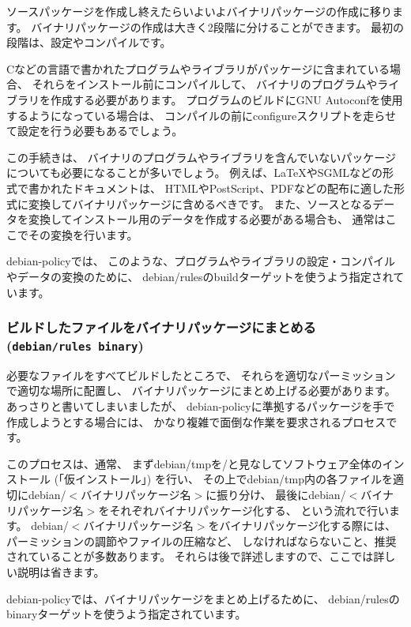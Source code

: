 \documentclass[mingoth,a4paper]{jsarticle}
\begin{document}
ソースパッケージを作成し終えたらいよいよバイナリパッケージの作成に移ります。
バイナリパッケージの作成は大きく2段階に分けることができます。
最初の段階は、設定やコンパイルです。

Cなどの言語で書かれたプログラムやライブラリがパッケージに含まれている場合、
それらをインストール前にコンパイルして、
バイナリのプログラムやライブラリを作成する必要があります。
プログラムのビルドにGNU Autoconfを使用するようになっている場合は、
コンパイルの前にconfigureスクリプトを走らせて設定を行う必要もあるでしょう。

この手続きは、
バイナリのプログラムやライブラリを含んでいないパッケージについても必要になることが多いでしょう。
例えば、\LaTeX{}やSGMLなどの形式で書かれたドキュメントは、
HTMLやPostScript、PDFなどの配布に適した形式に変換してバイナリパッケージに含めるべきです。
また、ソースとなるデータを変換してインストール用のデータを作成する必要がある場合も、
通常はここでその変換を行います。

debian-policyでは、
このような、プログラムやライブラリの設定・コンパイルやデータの変換のために、
debian/rulesのbuildターゲットを使うよう指定されています。


\subsubsection{ビルドしたファイルをバイナリパッケージにまとめる (\texttt{debian/rules binary})}

必要なファイルをすべてビルドしたところで、
それらを適切なパーミッションで適切な場所に配置し、
バイナリパッケージにまとめ上げる必要があります。
あっさりと書いてしまいましたが、
debian-policyに準拠するパッケージを手で作成しようとする場合には、
かなり複雑で面倒な作業を要求されるプロセスです。

このプロセスは、通常、
まずdebian/tmpを/と見なしてソフトウェア全体のインストール (「仮インストール」) を行い、
その上でdebian/tmp内の各ファイルを適切にdebian/$<$バイナリパッケージ名$>$に振り分け、
最後にdebian/$<$バイナリパッケージ名$>$をそれぞれバイナリパッケージ化する、
という流れで行います。
debian/$<$バイナリパッケージ名$>$をバイナリパッケージ化する際には、
パーミッションの調節やファイルの圧縮など、
しなければならないこと、推奨されていることが多数あります。
それらは後で詳述しますので、ここでは詳しい説明は省きます。

debian-policyでは、バイナリパッケージをまとめ上げるために、
debian/rulesのbinaryターゲットを使うよう指定されています。
\end{document}
